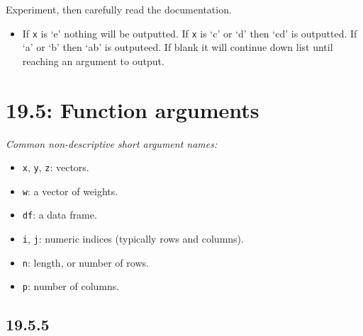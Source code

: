 \documentclass[]{book}
\providecommand{\tightlist}{%
  \setlength{\itemsep}{0pt}\setlength{\parskip}{0pt}}
\theoremstyle{definition}
\theoremstyle{definition}
\theoremstyle{definition}
\theoremstyle{remark}
\begin{document}
\begin{enumerate}
  Experiment, then carefully read the documentation.

  \begin{itemize}
  \tightlist
  \item
    If \texttt{x} is `e' nothing will be outputted. If \texttt{x} is `c'
    or `d' then `cd' is outputted. If `a' or `b' then `ab' is outputeed.
    If blank it will continue down list until reaching an argument to
    output.
  \end{itemize}
\end{enumerate}

\hypertarget{function-arguments}{%
\section{19.5: Function arguments}\label{function-arguments}}

\emph{Common non-descriptive short argument names: }

\begin{itemize}
\tightlist
\item
  \texttt{x}, \texttt{y}, \texttt{z}: vectors.
\item
  \texttt{w}: a vector of weights.
\item
  \texttt{df}: a data frame.
\item
  \texttt{i}, \texttt{j}: numeric indices (typically rows and columns).
\item
  \texttt{n}: length, or number of rows.
\item
  \texttt{p}: number of columns.
\end{itemize}

\hypertarget{section-65}{%
\subsection{19.5.5}\label{section-65}}
\end{document}
